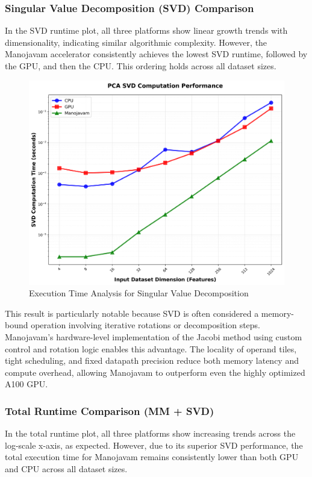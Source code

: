 \subsubsection{Singular Value Decomposition (SVD) Comparison}
In the SVD runtime plot, all three platforms show linear growth trends with dimensionality, indicating similar algorithmic complexity. However, the Manojavam accelerator consistently achieves the lowest SVD runtime, followed by the GPU, and then the CPU. This ordering holds across all dataset sizes.

\begin{figure}[H]
	\centerline{\includegraphics[scale = 0.50]{Figures/svd_performance.png}}
	\caption{Execution Time Analysis for Singular Value Decomposition}
	\label{fig:Execution Time Analysis for Singular Value Decomposition}
\end{figure}

This result is particularly notable because SVD is often considered a memory-bound operation involving iterative rotations or decomposition steps. Manojavam's hardware-level implementation of the Jacobi method using custom control and rotation logic enables this advantage. The locality of operand tiles, tight scheduling, and fixed datapath precision reduce both memory latency and compute overhead, allowing Manojavam to outperform even the highly optimized A100 GPU.

\subsubsection{Total Runtime Comparison (MM + SVD)}
In the total runtime plot, all three platforms show increasing trends across the log-scale x-axis, as expected. However, due to its superior SVD performance, the total execution time for Manojavam remains consistently lower than both GPU and CPU across all dataset sizes.

